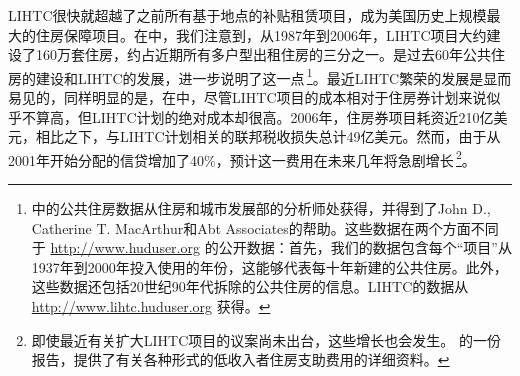 \documentclass[lang=cn,11pt,a4paper]{paper}
\begin{document}
LIHTC很快就超越了之前所有基于地点的补贴租赁项目，成为美国历史上规模最大的住房保障项目。在中，我们注意到，从1987年到2006年，LIHTC项目大约建设了160万套住房，约占近期所有多户型出租住房的三分之一。是过去60年公共住房的建设和LIHTC的发展，进一步说明了这一点\,\footnote{中的公共住房数据从住房和城市发展部的分析师处获得，并得到了John D., Catherine T. MacArthur和Abt Associates的帮助。这些数据在两个方面不同于 \url{http://www.huduser.org} 的公开数据：首先，我们的数据包含每个“项目”从1937年到2000年投入使用的年份，这能够代表每十年新建的公共住房。此外，这些数据还包括20世纪90年代拆除的公共住房的信息。LIHTC的数据从 \url{http://www.lihtc.huduser.org} 获得。}。最近LIHTC繁荣的发展是显而易见的，同样明显的是，在中，尽管LIHTC项目的成本相对于住房券计划来说似乎不算高，但LIHTC计划的绝对成本却很高。2006年，住房券项目耗资近210亿美元，相比之下，与LIHTC计划相关的联邦税收损失总计49亿美元。然而，由于从2001年开始分配的信贷增加了40\%，预计这一费用在未来几年将急剧增长\,\footnote{即使最近有关扩大LIHTC项目的议案尚未出台，这些增长也会发生。\cite{USCongress2005} 的一份报告，提供了有关各种形式的低收入者住房支助费用的详细资料。}。
\end{document}
